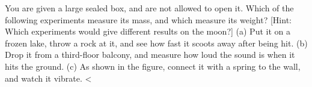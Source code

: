 You are given a large sealed box, and are not allowed to
open it. Which of the following experiments measure its
mass, and which measure its weight?  [Hint: Which experiments would
give different results on the moon?] \hwendpart
 (a) Put it on a frozen
lake, throw a rock at it, and see how fast it scoots away after
being hit.\hwendpart
 (b) Drop it from a third-floor balcony, and
measure how loud the sound is when it hits the ground.\hwendpart
 (c) As shown in the figure, connect it with a spring to the
wall, and watch it vibrate.\hwendpart
%
  <%
